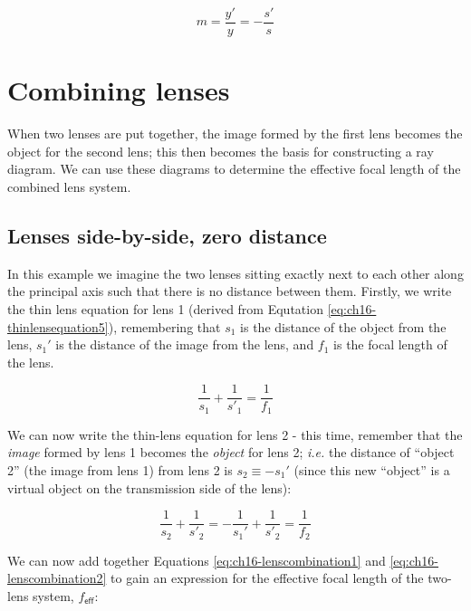 \documentclass[
]{book}
\begin{document}
\begin{equation}
m = \frac{y'}{y} = -\frac{s'}{s}
\end{equation}

\hypertarget{sec:ch16-lenscombination1}{%
\section{Combining lenses}\label{sec:ch16-lenscombination1}}

When two lenses are put together, the image formed by the first lens becomes the object for the second lens; this then becomes the basis for constructing a ray diagram. We can use these diagrams to determine the effective focal length of the combined lens system.

\hypertarget{sec:ch16-2lenszerodistance}{%
\subsection{Lenses side-by-side, zero distance}\label{sec:ch16-2lenszerodistance}}

In this example we imagine the two lenses sitting exactly next to each other along the principal axis such that there is no distance between them. Firstly, we write the thin lens equation for lens 1 (derived from Equtation \eqref{eq:ch16-thinlensequation5}), remembering that \(s_1\) is the distance of the object from the lens, \(s_1'\) is the distance of the image from the lens, and \(f_1\) is the focal length of the lens.

\begin{equation}
\frac{1}{s_1} + \frac{1}{s'_1} = \frac{1}{f_1}
\label{eq:ch16-lenscombination1}
\end{equation}

We can now write the thin-lens equation for lens 2 - this time, remember that the \emph{image} formed by lens 1 becomes the \emph{object} for lens 2; \emph{i.e.} the distance of ``object 2'' (the image from lens 1) from lens 2 is \(s_2 \equiv - s_1'\) (since this new ``object'' is a virtual object on the transmission side of the lens):

\begin{equation}
\frac{1}{s_2} + \frac{1}{s'_2} = -\frac{1}{s_1'} + \frac{1}{s'_2}= \frac{1}{f_2}
\label{eq:ch16-lenscombination2}
\end{equation}

We can now add together Equations \eqref{eq:ch16-lenscombination1} and \eqref{eq:ch16-lenscombination2} to gain an expression for the effective focal length of the two-lens system, \(f_{\textsf{eff}}\):
\end{document}
